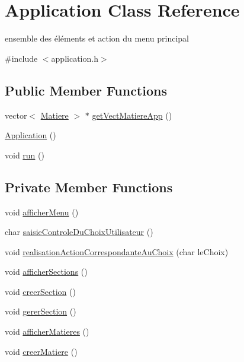 \hypertarget{class_application}{\section{Application Class Reference}
\label{class_application}
}


ensemble des éléments et action du menu principal  




{\ttfamily \#include $<$application.\+h$>$}

\subsection*{Public Member Functions}
\begin{DoxyCompactItemize}
\item 
vector$<$ \hyperlink{class_matiere}{Matiere} $>$ $\ast$ \hyperlink{class_application_adf59d6a0ecdc83288605c6a1a952bdd0}{get\+Vect\+Matiere\+App} ()
\item 
\hyperlink{class_application_afa8cc05ce6b6092be5ecdfdae44e05f8}{Application} ()
\item 
void \hyperlink{class_application_a68965449404743bf1add056784d6cf81}{run} ()
\end{DoxyCompactItemize}
\subsection*{Private Member Functions}
\begin{DoxyCompactItemize}
\item 
void \hyperlink{class_application_aef7daa6aaa1eefe73663d70bf3b86d4c}{afficher\+Menu} ()
\item 
char \hyperlink{class_application_af37c055a9dde1f5006413ab7f8ddc2ce}{saisie\+Controle\+Du\+Choix\+Utilisateur} ()
\item 
void \hyperlink{class_application_acb082ff0c42e6d4a906c589a31c22fc3}{realisation\+Action\+Correspondante\+Au\+Choix} (char le\+Choix)
\item 
void \hyperlink{class_application_a63ca3c3beb6f3a62739d0a2005546758}{afficher\+Sections} ()
\item 
void \hyperlink{class_application_a9f05868c8936a996e1b4e7a04b3e4c9d}{creer\+Section} ()
\item 
void \hyperlink{class_application_a3cfad12ed5d0c2b6a1468aeec5e26c2b}{gerer\+Section} ()
\item 
void \hyperlink{class_application_a9cae102801b3c14a5a0e85123829ef25}{afficher\+Matieres} ()
\item 
void \hyperlink{class_application_a9d2b9b0edc784f4388b51cbc84c4de8c}{creer\+Matiere} ()
\end{DoxyCompactItemize}
